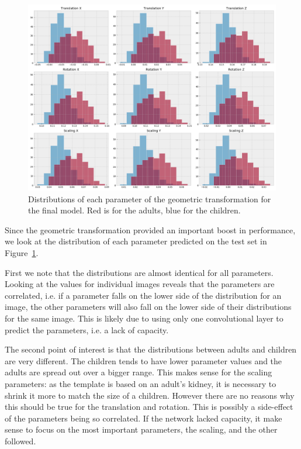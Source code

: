 \begin{figure}[htbp]
    \centering
	\includegraphics[width=\textwidth]{img_seg/transfo_matrix}
    \caption{Distributions of each parameter of the geometric transformation for the final model. Red is for the adults, blue for the children.}
    \label{fig:transfo_matrix}
\end{figure}

Since the geometric transformation provided an important boost in performance, we look at the distribution of each parameter predicted on the test set in Figure~\ref{fig:transfo_matrix}. 

First we note that the distributions are almost identical for all parameters. Looking at the values for individual images reveals that the parameters are correlated, i.e. if a parameter falls on the lower side of the distribution for an image, the other parameters will also fall on the lower side of their distributions for the same image. This is likely due to using only one convolutional layer to predict the parameters, i.e. a lack of capacity.

The second point of interest is that the distributions between adults and children are very different. The children tends to have lower parameter values and the adults are spread out over a bigger range. This makes sense for the scaling parameters: as the template is based on an adult's kidney, it is necessary to shrink it more to match the size of a children. However there are no reasons why this should be true for the translation and rotation. This is possibly a side-effect of the parameters being so correlated. If the network lacked capacity, it make sense to focus on the most important parameters, the scaling, and the other followed.

